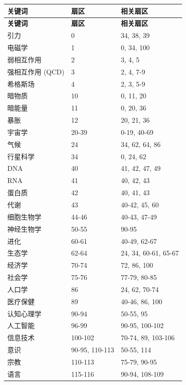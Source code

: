 \documentclass[11pt,a4paper]{article}
\begin{document}
	\begin{longtable}{|p{5cm}|p{3cm}|p{4cm}|}
		\hline
		\textbf{关键词} & \textbf{扇区} & \textbf{相关扇区} \\
		\hline
		\endfirsthead
		\hline
		\textbf{关键词} & \textbf{扇区} & \textbf{相关扇区} \\
		\hline
		\endhead
		引力 & 0 & 34, 38, 39 \\
		电磁学 & 1 & 0, 34, 100 \\
		弱相互作用 & 2 & 3, 4, 5 \\
		强相互作用 (QCD) & 3 & 2, 4, 7-9 \\
		希格斯场 & 4 & 2, 3, 5-9 \\
		暗物质 & 10 & 0, 11, 20 \\
		暗能量 & 11 & 0, 20, 36 \\
		暴胀 & 12 & 20, 21, 36 \\
		宇宙学 & 20-39 & 0-19, 40-69 \\
		气候 & 24 & 34, 62, 64, 86 \\
		行星科学 & 34 & 0, 24, 62 \\
		DNA & 40 & 41, 42, 47, 49 \\
		RNA & 41 & 40, 42, 43 \\
		蛋白质 & 42 & 40, 41, 43 \\
		代谢 & 43 & 40-42, 45, 60 \\
		细胞生物学 & 44-46 & 40-43, 47-49 \\
		神经生物学 & 50-55 & 90-95 \\
		进化 & 60-61 & 40-49, 62-67 \\
		生态学 & 62-64 & 24, 34, 60-61, 65-67 \\
		经济学 & 70-74 & 72, 86, 100 \\
		社会学 & 75-76 & 77-79, 80-85 \\
		人口学 & 86 & 24, 62, 70-74 \\
		医疗保健 & 89 & 40-46, 86, 100 \\
		认知心理学 & 90-94 & 50-55, 95 \\
		人工智能 & 96-99 & 90-95, 100-102 \\
		信息技术 & 100-102 & 70-74, 89, 103-106 \\
		意识 & 90-95, 110-113 & 50-55, 114 \\
		宗教 & 110-113 & 75-79, 90-95 \\
		语言 & 115-116 & 90-94, 108-109 \\
		\hline
	\end{longtable}
	
\end{document}
